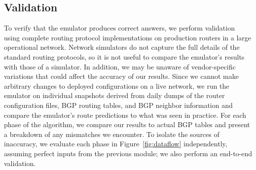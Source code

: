
\subsection{Validation}
\label{sec:validation}
To verify that the emulator produces correct answers,
we perform 
validation using complete routing protocol implementations
on production routers in a large operational network.  
Network simulators do not capture the full
details of the standard routing protocols, so it is not useful to
compare the emulator's results with those of a simulator.  
In addition, we may be 
unaware of vendor-specific variations that could affect the accuracy
of our results.  Since we cannot make arbitrary changes to deployed
configurations on a live network,
we run the emulator on individual snapshots derived from daily
dumps of the router configuration files, BGP routing tables, and BGP 
neighbor information and compare the emulator's route predictions to
what was seen in practice.  For each phase of the algorithm, we compare 
our results to actual BGP tables and present a breakdown of any 
mismatches we encounter.  To isolate the sources of inaccuracy, we 
evaluate each phase in Figure~\ref{fig:dataflow} independently, assuming
perfect inputs from  
the previous module; we also perform an end-to-end validation.

